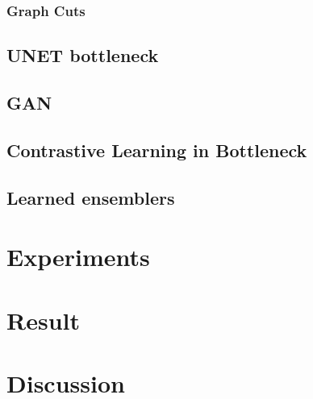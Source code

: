 \documentclass{article}
\begin{document}
        \subsubsection{Graph Cuts}

    \subsection{UNET bottleneck}

    \subsection{GAN}

    \subsection{Contrastive Learning in Bottleneck}
    
    \subsection{Learned ensemblers}

\section{Experiments}\label{section:experiments}
\section{Result}\label{section:results}

\section{Discussion}\label{section:model}


\newpage

\small
\printbibliography{}
\end{document}
